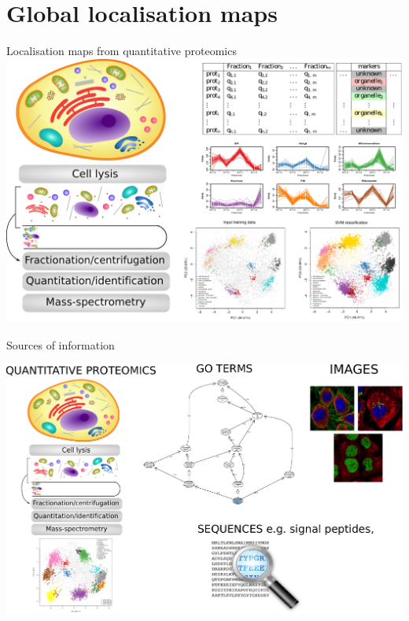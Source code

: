 \documentclass[bigger]{beamer}
\begin{document}

\section{Global localisation maps}

\begin{frame}{Localisation maps from quantitative proteomics}
      \includegraphics[width=1\linewidth]{Figures/lopit-new.pdf} 
\end{frame}
  
        


\begin{frame}{Sources of information}
  \vspace{0.5cm}
  \begin{centering}\includegraphics[width=1\linewidth]{Figures/data.pdf} 
  \end{centering} 
  \vspace{0.7cm}
\end{frame}
\end{document}
